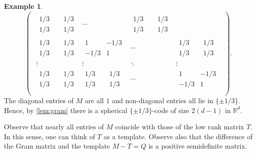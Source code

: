 \documentclass[reqno, 11pt]{amsart}
\theoremstyle{definition}
\newtheorem{example}[theorem]{Example}
\theoremstyle{remark}
\newcommand{\RR}{\mathbb{R}}
\begin{document}
\begin{example}
\[\begin{pmatrix}
\begin{array}{cccc}
\begin{matrix}
  					1/3 & \phantom{-}1/3 \\
  					1/3 & \phantom{-}1/3
  				\end{matrix} & \cdots & \begin{matrix}
 										 1/3 & \phantom{-}1/3 \\
  										1/3 & \phantom{-}1/3
 										 \end{matrix} \\
  \begin{matrix}
  1/3 & \phantom{-}1/3 \\
  1/3 & \phantom{-}1/3
  \end{matrix} & \begin{matrix}
 				 1 & -1/3 \\
 				 -1/3 & 1
 				 \end{matrix} & \cdots & \begin{matrix}
  										1/3 & \phantom{-}1/3 \\
  										1/3 & \phantom{-}1/3
  										\end{matrix} \\
  \vdots & \vdots & \ddots & \vdots \\
 
   \begin{matrix}
  1/3 & \phantom{-}1/3 \\
  1/3 & \phantom{-}1/3
  \end{matrix} & \begin{matrix}
 				 1/3 & \phantom{-}1/3 \\
 				 1/3 & \phantom{-}1/3
 				 \end{matrix} & \cdots & \begin{matrix}
  										1 & -1/3 \\
  										-1/3 & 1
  										\end{matrix} \\		
    \end{array}
\end{pmatrix}.
\]
The diagonal entries of $M$ are all $1$ and non-diagonal entries all lie in $\{\pm 1/3\}$. Hence, by \cref{lem:gram} there is a spherical $\{\pm1/3\}$-code of size $2(d-1)$ in $\RR^d$. 

\medskip

Observe that nearly all entries of $M$ coincide with those of the low rank matrix $T$. In this sense, one can think of $T$ as a template. Observe also that the difference of the Gram matrix and the template $M - T = Q$ is a positive semidefinite matrix. 
\end{example}
\end{document}
